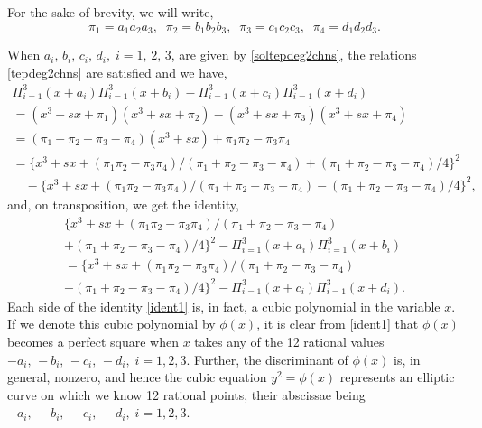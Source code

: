 \documentclass[11pt, leqno]{article}
\begin{document}
 For the sake of brevity, we will write,
\begin{equation}
\pi_1=a_1a_2a_3,\;\;\pi_2=b_1b_2b_3,\;\;\pi_3=c_1c_2c_3,\;\;\pi_4=d_1d_2d_3.
\end{equation}

When $a_i,\,b_i,\,c_i,\,d_i,\;i=1,\,2,\,3$, are  given by \eqref{soltepdeg2chns}, the  relations \eqref{tepdeg2chns} are satisfied and we  have,
\begin{multline}
\Pi_{i=1}^3(x+a_i)\Pi_{i=1}^3(x+b_i)-\Pi_{i=1}^3(x+c_i)\Pi_{i=1}^3(x+d_i)\\
=(x^3+sx+\pi_1)(x^3+sx+\pi_2)-(x^3+sx+\pi_3)(x^3+sx+\pi_4)\\
=(\pi_1+\pi_2-\pi_3-\pi_4)(x^3+sx)+\pi_1\pi_2-\pi_3\pi_4\quad \quad \quad \quad \quad  \\
=\{x^3+sx+(\pi_1\pi_2-\pi_3\pi_4)/(\pi_1+\pi_2-\pi_3-\pi_4)+(\pi_1+\pi_2-\pi_3-\pi_4)/4\}^2\\
\quad -\{x^3+sx+(\pi_1\pi_2-\pi_3\pi_4)/(\pi_1+\pi_2-\pi_3-\pi_4)-(\pi_1+\pi_2-\pi_3-\pi_4)/4\}^2,
\end{multline}
and, on transposition, we get the identity,
\begin{multline}
\{x^3+sx+(\pi_1\pi_2-\pi_3\pi_4)/(\pi_1+\pi_2-\pi_3-\pi_4)\\
+(\pi_1+\pi_2-\pi_3-\pi_4)/4\}^2-\Pi_{i=1}^3(x+a_i)\Pi_{i=1}^3(x+b_i)\\
=\{x^3+sx+(\pi_1\pi_2-\pi_3\pi_4)/(\pi_1+\pi_2-\pi_3-\pi_4)\\
-(\pi_1+\pi_2-\pi_3-\pi_4)/4\}^2-\Pi_{i=1}^3(x+c_i)\Pi_{i=1}^3(x+d_i). \label{ident1}
\end{multline}
Each side of the identity \eqref{ident1} is, in fact, a cubic polynomial in the variable $x$. If we denote this cubic polynomial by $\phi(x)$,  it is clear from \eqref{ident1} that $\phi(x)$  becomes a perfect square when $x$ takes any of the 12 rational values $-a_i,\,-b_i,\,-c_i,\,-d_i,\;i=1,2,3$. Further, the discriminant of 
$\phi(x)$ is, in general, nonzero, and hence the cubic equation $y^2=\phi(x)$ represents an elliptic curve on which we know 12 rational points,  their abscissae being  $-a_i,\,-b_i,\,-c_i,\,-d_i,\;i=1,2,3$.
\end{document}
